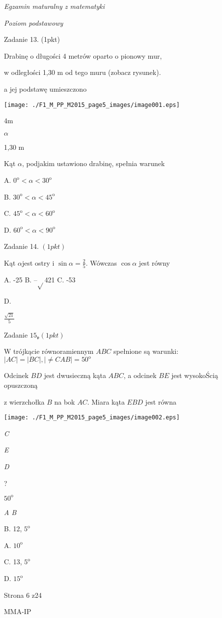 \documentclass[a4paper,12pt]{article}
\begin{document}
{\it Egzamin maturalny z matematyki}

{\it Poziom podstawowy}

Zadanie 13. (1pkt)

Drabinę o długości 4 metrów oparto o pionowy mur,

w odległości 1,30 m od tego muru (zobacz rysunek).

a jej podstawę umieszczono
\begin{center}
\texttt{[image: ./F1\_M\_PP\_M2015\_page5\_images/image001.eps]}
\end{center}
4m

$\alpha$

1,30 $\mathrm{m}$

Kąt $\alpha$, podjakim ustawiono drabinę, spełnia warunek

A. $0^{\mathrm{o}}<\alpha<30^{\mathrm{o}}$

B. $30^{\mathrm{o}}<\alpha<45^{\mathrm{o}}$

C. $45^{\mathrm{o}}<\alpha<60^{\mathrm{o}}$

D. $60^{\mathrm{o}}<\alpha<90^{\mathrm{o}}$

Zadanie 14. $(1pkt)$

Kąt $\alpha$jest ostry i $\displaystyle \sin\alpha=\frac{2}{5}$. Wówczas $\cos\alpha$ jest równy

A. -25 B. --$\sqrt{}$421 C. -53

D.

$\displaystyle \frac{\sqrt{21}}{5}$

Zadanie $15_{\mathfrak{v}}(1pkt)$

$\mathrm{W}$ trójkącie równoramiennym $ABC$ spełnione są warunki: $|AC|=|BC|, |\neq CAB|=50^{\mathrm{o}}$

Odcinek $BD$ jest dwusieczną kąta $ABC$, a odcinek $BE$ jest wysokoŚcią opuszczoną

z wierzchołka $B$ na bok $AC$. Miara kąta $EBD$ jest równa
\begin{center}
\texttt{[image: ./F1\_M\_PP\_M2015\_page5\_images/image002.eps]}
\end{center}
{\it C}

{\it E}

{\it D}

?

$50^{\mathrm{o}}$

{\it A  B}

B. 12, $5^{\mathrm{o}}$

A. $10^{\mathrm{o}}$

C. 13, $5^{\mathrm{o}}$

D. $15^{\mathrm{o}}$

Strona 6 z24

MMA-IP
\end{document}
